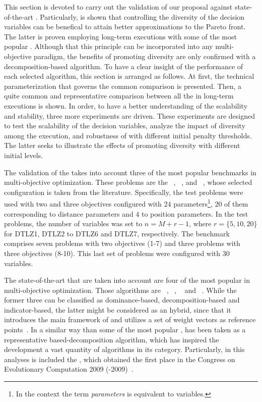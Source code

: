 This section is devoted to carry out the validation of our proposal against state-of-the-art \MOEAS{}.
%
Particularly, is shown that controlling the diversity of the decision variables can be benefical to attain better approximations to the Pareto front.
%
The latter is proven employing long-term executions with some of the most popular \MOEAS{}.
%
Although that this principle can be incorporated into any multi-objective paradigm, the benefits of promoting diversity are only confirmed with a decomposition-based algorithm.
%
To have a clear insight of the performance of each selected algorithm, this section is arranged as follows.
%
At first, the technical parameterization that governs the common comparison is presented.
%
Then, a quite common and representative comparison between all the \MOEAS{} in long-term executions is shown.
%
In order, to have a better understanding of the scalability and stability, three more experiments are driven.
%
These experiments are designed to test the scalability of the decision variables, analyze the impact of diversity among the execution, and robustness of \VSDMOEAD{} with different initial penalty thresholds.
%
The latter seeks to illustrate the effects of promoting diversity with different initial levels.
%

The validation of the \MOEAS{} takes into account three of the most popular benchmarks in multi-objective optimization.
%
These problems are the \WFG{}~\cite{huband2006review}, \DTLZ{}~\cite{deb2005scalable}, and \UF{}~\cite{zhang2008multiobjective}, whose selected configuration is taken from the literature.
%
Specifically, the \WFG{} test problems were used with two and three objectives configured with $24$ parameters\footnote{In the \WFG{} context the term \textit{parameters} is equivalent to variables.}, $20$ of them corresponding to distance parameters and $4$ to position parameters.
%
In the \DTLZ{} test problems, the number of variables was set to $n=M+r-1$, where $r=\{5, 10, 20\}$ for DTLZ1, DTLZ2 to DTLZ6 and DTLZ7, respectively.
% 
The \UF{} benchmark comprises seven problems with two objectives (\UF{}1-7) and three problems with three objectives (\UF{}8-10).
%
This last set of problems were configured with $30$ variables.
%

The state-of-the-art \MOEAS{} that are taken into account are four of the most popular in multi-objective optimization.
%
Those algorithms are \NSGAII{}~\cite{deb2002fast}, \MOEADDE{}~\cite{zhang2009performance}, \RMOEA{}~\cite{trautmann2013r2} and \NSGAIII{}~\cite{deb2013evolutionary}.
%
While the former three can be classified as dominance-based, decomposition-based and indicator-based, the latter might be considered as an hybrid, since that it introduces the main framework of \NSGAII{} and utilizes a set of weight vectors as reference points~\cite{trivedi2016survey}.
%
In a similar way than some of the most popular \MOEAS{}, \MOEAD{} has been taken as a representative based-decomposition algorithm, which has inspired the development a vast quantity of algorithms in its category.
%
Particularly, in this analyses is included the \MOEADDE{}, which obtained the first place in the Congress on Evolutionary Computation 2009 (\CEC{}-2009)~\cite{zhang2009performance}.
%

